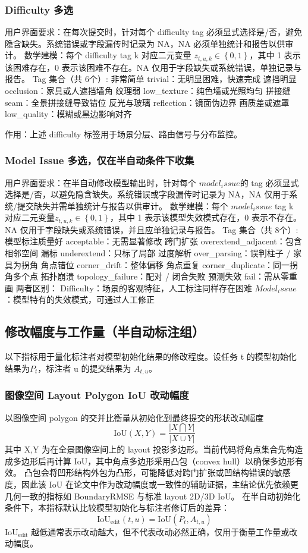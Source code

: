 \documentclass[journal,onecolumn]{IEEEtran}
\begin{document}
\subsubsection{Difficulty 多选}
用户界面要求：在每次提交时，针对每个 difficulty tag 必须显式选择是/否，避免隐含缺失。系统错误或字段漏传时记录为 NA，NA 必须单独统计和报告以供审计。
数学建模：每个 difficulty tag k 对应二元变量 $z_{t,u,k}\in\left\{0,1\right\}$，其中 1 表示该困难存在，0 表示该困难不存在。NA 仅用于字段缺失或系统错误，单独记录与报告。
Tag 集合（共 6个）:
非常简单 trivial：无明显困难，快速完成
遮挡明显 occlusion：家具或人遮挡墙角
纹理弱 low_texture：纯色墙或光照均匀
拼接缝 seam：全景拼接缝导致错位
反光与玻璃 reflection：镜面伪边界
画质差或遮罩 low_quality：模糊或黑边影响对齐

作用：上述 difficulty 标签用于场景分层、路由信号与分布监控。
\subsubsection{Model Issue 多选，仅在半自动条件下收集}
用户界面要求：在半自动修改模型输出时，针对每个 $model_issue$的 tag 必须显式选择是/否，以避免隐含缺失。系统错误或字段漏传时记录为 NA，NA 仅用于系统/提交缺失并需单独统计与报告以供审计。
数学建模：每个 $model_issue$ tag k 对应二元变量$z_{t,u,k}\in\left\{0,1\right\}$，其中 1 表示该模型失效模式存在，0 表示不存在。NA 仅用于字段缺失或系统错误，并且应单独记录与报告。
Tag 集合（共 8个）:
模型标注质量好 acceptable：无需显著修改
跨门扩张 overextend_adjacent：包含相邻空间
漏标 underextend：只标了局部
过度解析 over_parsing：误判柱子 / 家具为拐角
角点错位 corner_drift：整体偏移
角点重复 corner_duplicate：同一拐角多个点
拓扑崩溃 topology_failure：配对 / 闭合失败
预测失效 fail：需从零重画
两者区别：
Difficulty：场景的客观特征，人工标注同样存在困难
$Model_issue$：模型特有的失效模式，可通过人工修正
\subsection{修改幅度与工作量（半自动标注组）}

以下指标用于量化标注者对模型初始化结果的修改程度。设任务 t 的模型初始化结果为$P_t$，标注者 u 的提交结果为 $A_{t,u}$。
\subsubsection{图像空间 Layout Polygon IoU 改动幅度}
以图像空间 polygon 的交并比衡量从初始化到最终提交的形状改动幅度
\[\mathrm{IoU}\left(X,Y\right)=\frac{\left|X\bigcap Y\right|}{\left|X\cup Y\right|}\]
其中 X,Y 为在全景图像空间上的 layout 投影多边形。当前代码将角点集合先构造成多边形后再计算 IoU，其中角点多边形采用凸包（convex hull）以确保多边形有效。
凸包会将凹形结构外包为凸形，可能降低对跨门扩张或凹结构错误的敏感度，因此该 IoU 在论文中作为改动幅度或一致性的辅助证据，主结论优先依赖更几何一致的指标如 BoundaryRMSE 与标准 layout 2D/3D IoU。
在半自动初始化条件下，本指标默认比较模型初始化与标注者修订后的差异：
\[\mathrm{IoU}_{\mathrm{edit}}\left(t,u\right)=\mathrm{IoU}\left(P_t,A_{t,u}\right)\]
$\mathrm{IoU}_{\mathrm{edit}}$ 越低通常表示改动越大，但不代表改动必然正确，仅用于衡量工作量或改动幅度。
\end{document}
